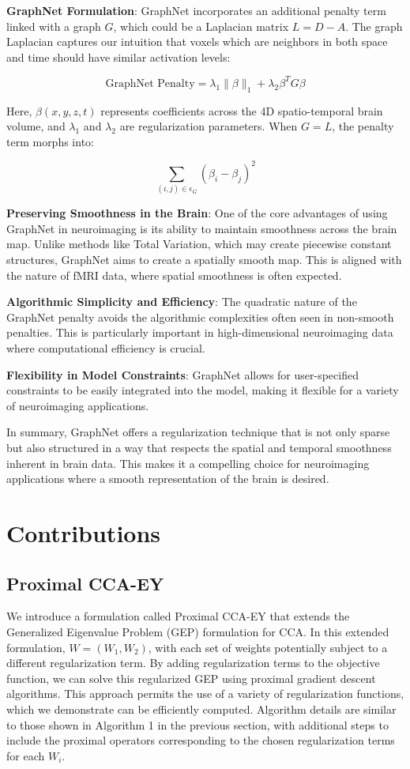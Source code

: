 \textbf{GraphNet Formulation}: GraphNet incorporates an additional penalty term linked with a graph \(G\), which could be a Laplacian matrix \(L = D - A\).
The graph Laplacian captures our intuition that voxels which are neighbors in both space and time should have similar activation levels:

\[
    \text{GraphNet Penalty} = \lambda_{1} \lVert \beta \rVert_{1} + \lambda_{2} \beta^T G \beta
\]

Here, \(\beta(x, y, z, t)\) represents coefficients across the 4D spatio-temporal brain volume, and \(\lambda_{1}\) and \(\lambda_{2}\) are regularization parameters. When \(G = L\), the penalty term morphs into:

\[
    \sum_{(i, j) \in \epsilon_{G}} (\beta_{i} - \beta_{j})^{2}
\]

\textbf{Preserving Smoothness in the Brain}: One of the core advantages of using GraphNet in neuroimaging is its ability to maintain smoothness across the brain map.
Unlike methods like Total Variation, which may create piecewise constant structures, GraphNet aims to create a spatially smooth map.
This is aligned with the nature of fMRI data, where spatial smoothness is often expected.

\textbf{Algorithmic Simplicity and Efficiency}: The quadratic nature of the GraphNet penalty avoids the algorithmic complexities often seen in non-smooth penalties.
This is particularly important in high-dimensional neuroimaging data where computational efficiency is crucial.

\textbf{Flexibility in Model Constraints}: GraphNet allows for user-specified constraints to be easily integrated into the model, making it flexible for a variety of neuroimaging applications.

In summary, GraphNet offers a regularization technique that is not only sparse but also structured in a way that respects the spatial and temporal smoothness inherent in brain data.
This makes it a compelling choice for neuroimaging applications where a smooth representation of the brain is desired.


\section{Contributions}

\subsection{Proximal CCA-EY}
We introduce a formulation called Proximal CCA-EY that extends the Generalized Eigenvalue Problem (GEP) formulation for CCA. In this extended formulation, \( W = (W_1, W_2) \), with each set of weights potentially subject to a different regularization term.
By adding regularization terms to the objective function, we can solve this regularized GEP using proximal gradient descent algorithms.
This approach permits the use of a variety of regularization functions, which we demonstrate can be efficiently computed.
Algorithm details are similar to those shown in Algorithm 1 in the previous section, with additional steps to include the proximal operators corresponding to the chosen regularization terms for each \( W_i \).

